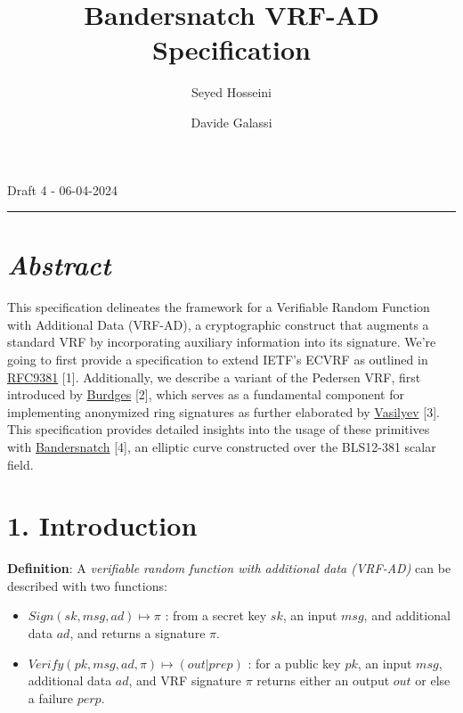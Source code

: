 \documentclass[
]{article}
\title{Bandersnatch VRF-AD Specification}
\author{Seyed Hosseini \and Davide Galassi}
\date{}
\providecommand{\tightlist}{%
  \setlength{\itemsep}{0pt}\setlength{\parskip}{0pt}}
\begin{document}
\maketitle

Draft 4 - 06-04-2024

\newcommand{\G}{\langle G \rangle}
\newcommand{\F}{\mathbb{Z}^*_r}

\begin{center}\rule{0.5\linewidth}{0.5pt}\end{center}

\hypertarget{abstract}{%
\section{\texorpdfstring{\emph{Abstract}}{Abstract}}\label{abstract}}

This specification delineates the framework for a Verifiable Random
Function with Additional Data (VRF-AD), a cryptographic construct that
augments a standard VRF by incorporating auxiliary information into its
signature. We're going to first provide a specification to extend IETF's
ECVRF as outlined in
\href{https://datatracker.ietf.org/doc/rfc9381}{RFC9381} {[}1{]}.
Additionally, we describe a variant of the Pedersen VRF, first
introduced by \href{https://eprint.iacr.org/2023/002}{Burdges} {[}2{]},
which serves as a fundamental component for implementing anonymized ring
signatures as further elaborated by
\href{https://hackmd.io/ulW5nFFpTwClHsD0kusJAA}{Vasilyev} {[}3{]}. This
specification provides detailed insights into the usage of these
primitives with \href{https://eprint.iacr.org/2021/1152}{Bandersnatch}
{[}4{]}, an elliptic curve constructed over the BLS12-381 scalar field.

\hypertarget{introduction}{%
\section{1. Introduction}\label{introduction}}

\textbf{Definition}: A \emph{verifiable random function with additional
data (VRF-AD)} can be described with two functions:

\begin{itemize}
\tightlist
\item
  \(Sign(sk,msg,ad) \mapsto \pi\) : from a secret key \(sk\), an input
  \(msg\), and additional data \(ad\), and returns a signature \(\pi\).
\item
  \(Verify(pk,msg,ad,\pi) \mapsto (out|prep)\) : for a public key
  \(pk\), an input \(msg\), additional data \(ad\), and VRF signature
  \(\pi\) returns either an output \(out\) or else a failure \(perp\).
\end{itemize}
\end{document}
